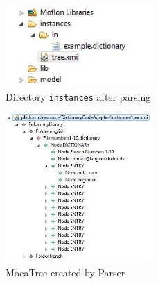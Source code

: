 \begin{figure}[htp]
\begin{center}
 \includegraphics[width=0.5\textwidth]{pics/moca/2TextToMocaTree/9-ParseResult1}
  \caption{Directory \texttt{instances} after parsing}
  \label{moca-9-ParseResult1}
\end{center}
\end{figure}
 

\begin{figure}[htp]
\begin{center}
 \includegraphics[width=0.5\textwidth]{pics/moca/2TextToMocaTree/10-ParseResult2}
  \caption{MocaTree created by Parser}
  \label{moca-10-ParseResult2}
\end{center}
\end{figure}


